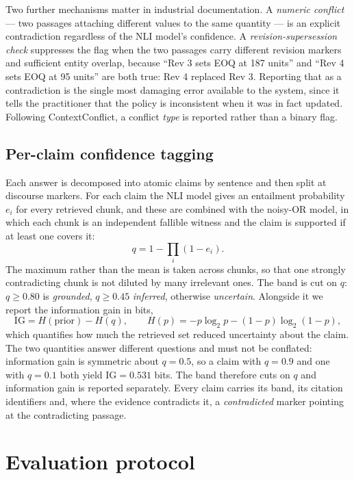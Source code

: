 \documentclass[preprint,3p,times]{elsarticle}
\begin{document}
Two further mechanisms matter in industrial documentation. A \emph{numeric
conflict} --- two passages attaching different values to the same quantity ---
is an explicit contradiction regardless of the NLI model's confidence. A
\emph{revision-supersession check} suppresses the flag when the two passages
carry different revision markers and sufficient entity overlap, because ``Rev 3
sets EOQ at 187 units'' and ``Rev 4 sets EOQ at 95 units'' are both true: Rev 4
replaced Rev 3. Reporting that as a contradiction is the single most damaging
error available to the system, since it tells the practitioner that the policy
is inconsistent when it was in fact updated. Following ContextConflict, a
conflict \emph{type} is reported rather than a binary flag.

\subsection{Per-claim confidence tagging}

Each answer is decomposed into atomic claims by sentence and then split at
discourse markers. For each claim the NLI model gives an entailment probability
$e_i$ for every retrieved chunk, and these are combined with the noisy-OR
model, in which each chunk is an independent fallible witness and the claim is
supported if at least one covers it:
\begin{equation}
q=1-\prod_i(1-e_i).
\end{equation}
The maximum rather than the mean is taken across chunks, so that one strongly
contradicting chunk is not diluted by many irrelevant ones. The band is cut on
$q$: $q\geq0.80$ is \emph{grounded}, $q\geq0.45$ \emph{inferred}, otherwise
\emph{uncertain}. Alongside it we report the information gain in bits,
\begin{equation}
\mathrm{IG}=H(\text{prior})-H(q),\qquad
H(p)=-p\log_2p-(1-p)\log_2(1-p),
\end{equation}
which quantifies how much the retrieved set reduced uncertainty about the claim.
The two quantities answer different questions and must not be conflated:
information gain is symmetric about $q=0.5$, so a claim with $q=0.9$ and one
with $q=0.1$ both yield $\mathrm{IG}=0.531$ bits. The band therefore cuts on
$q$ and information gain is reported separately. Every claim carries its band,
its citation identifiers and, where the evidence contradicts it, a
\emph{contradicted} marker pointing at the contradicting passage.

\section{Evaluation protocol}
\label{sec:protocol}
\end{document}
